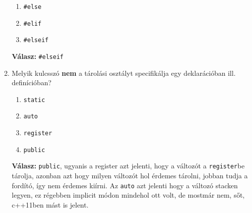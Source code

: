 \documentclass[../cpp_book/cpp_book.tex]{subfiles}
\begin{document}
\begin{enumerate}[1.)]
\begin{enumerate}
			\item \texttt{\#else}
			\item \texttt{\#elif}
			\item \texttt{\#elseif}
		\end{enumerate}
		\textbf{Válasz:} \texttt{\#elseif}
		\item Melyik kulcsszó \textbf{nem} a tárolási osztályt specifikálja egy deklarációban ill.
		definícióban?
		\begin{enumerate}
			\item \texttt{static}
			\item \texttt{auto}
			\item \texttt{register}
			\item \texttt{public}
		\end{enumerate}
		\textbf{Válasz:} \texttt{public}, ugyanis a register azt jelenti, hogy a változót a \texttt{register}be tárolja, azonban azt hogy milyen változót hol érdemes tárolni, jobban tudja a fordító, így nem érdemes kiírni. Az \texttt{auto} azt jelenti hogy a változó stacken legyen, ez régebben implicit módon mindehol ott volt, de mostmár nem, sőt, c++11ben mást is jelent.
		

\end{enumerate}
\end{document}
